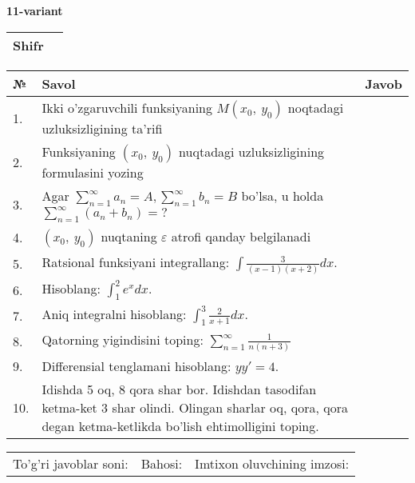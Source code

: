 \documentclass{article}
\begin{document}
  \egroup
  
  \newpage
  
  
  \textbf{11-variant}\\
  
  \bgroup
  \def\arraystretch{1.6} %
  
  \begin{tabular}{|m{5.7cm}|m{9.5cm}|}
  \hline
  Shifr & \\
  \hline
  \end{tabular}
  
  \vspace{1cm}
  
  \begin{tabular}{|m{0.7cm}|m{10cm}|m{4cm}|}
  \hline
  № & Savol & Javob \\
  \hline
  1. & Ikki o'zgaruvchili funksiyaning \(M(x_{0},\ y_{0})\) noqtadagi uzluksizligining ta'rifi &  \\
  \hline
  2. & Funksiyaning \((x_{0},\ y_{0})\) nuqtadagi uzluksizligining formulasini yozing &  \\
  \hline
  3. & Agar \(\sum_{n = 1}^{\infty}a_{n} = A,\sum_{n = 1}^{\infty}b_{n} = B\) bo'lsa, u holda \(\sum_{n = 1}^{\infty}\left( a_{n} + b_{n} \right) = ?\) &  \\
  \hline
  4. & \((x_{0},\ y_{0})\) nuqtaning \(\varepsilon\) atrofi qanday belgilanadi &  \\
  \hline
  5. & Ratsional funksiyani integrallang: \(\int {\frac{3}{(x - 1)(x + 2)}dx}\). &  \\
  \hline
  6. & Hisoblang: \(\int_{1}^{2}{e^{x}dx}\). &  \\
  \hline
  7. & Aniq integralni hisoblang: \(\int_{1}^{3}\frac{2}{x + 1}dx\). &  \\
  \hline
  8. & Qatorning yigindisini toping: \(\sum_{n = 1}^{\infty}\frac{1}{n(n + 3)}\) &  \\
  \hline
  9. & Differensial tenglamani hisoblang: \(yy' = 4\). &  \\
  \hline
  10. & Idishda 5 oq, 8 qora shar bor. Idishdan tasodifan ketma-ket 3 shar olindi. Olingan sharlar oq, qora, qora degan ketma-ketlikda bo'lish ehtimolligini toping. &  \\
  \hline
  \end{tabular}
  
  \vspace{1cm}
  
  \begin{tabular}{lll}
  To'g'ri javoblar soni: \underline{\hspace{1.5cm}} & 
  Bahosi: \underline{\hspace{1.5cm}} & 
  Imtixon oluvchining imzosi: \underline{\hspace{2cm}} \\
  \end{tabular}
  
\end{document}
